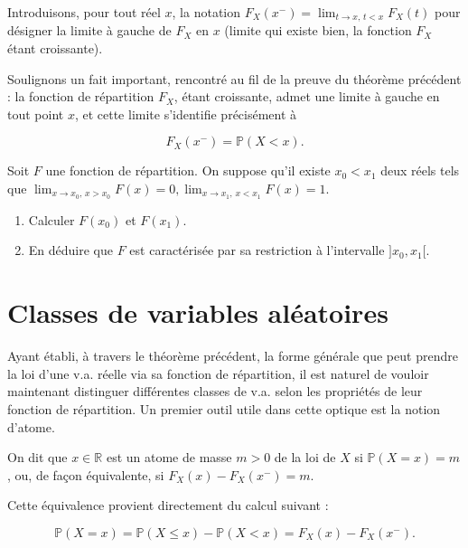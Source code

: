 Introduisons, pour tout réel $x$, la notation $F_X(x^-) = \lim_{t \to x,\, t < x} F_X(t)$ pour désigner la limite à gauche de $F_X$ en $x$ (limite qui existe bien, la fonction $F_X$ étant croissante).

Soulignons un fait important, rencontré au fil de la preuve du théorème précédent : la fonction de répartition $F_X$, étant croissante, admet une limite à gauche en tout point $x$, et cette limite s'identifie précisément à

$$
F_X(x^-) = \mathbb{P}(X < x).
$$
\begin{exercice}
Soit $F$ une fonction de répartition. On suppose qu'il existe $x_0 < x_1$ deux réels tels que $\lim_{x \to x_0, \, x > x_0} F(x) = 0, \lim_{x \to x_1, \, x < x_1} F(x) = 1$.

\begin{enumerate}
\item Calculer $F(x_0)$ et $F(x_1)$.
\item En déduire que $F$ est caractérisée par sa restriction à l'intervalle $]x_0, x_1[$.
\end{enumerate}
\end{exercice}

\newpage

\section{Classes de variables aléatoires}

Ayant établi, à travers le théorème précédent, la forme générale que peut prendre la loi d'une v.a. réelle via sa fonction de répartition, il est naturel de vouloir maintenant distinguer différentes classes de v.a. selon les propriétés de leur fonction de répartition. Un premier outil utile dans cette optique est la notion d'atome.

\medskip

\begin{mdframed}
\begin{definition}
On dit que $x \in \mathbb{R}$ est un atome de masse $m > 0$ de la loi de $X$ si $\mathbb{P}(X = x) = m$, ou, de façon équivalente, si $F_X(x) - F_X(x^-) = m$.
\end{definition}
\end{mdframed}

Cette équivalence provient directement du calcul suivant :

$$
\mathbb{P}(X = x) = \mathbb{P}(X \leq x) - \mathbb{P}(X < x) = F_X(x) - F_X(x^-).
$$

